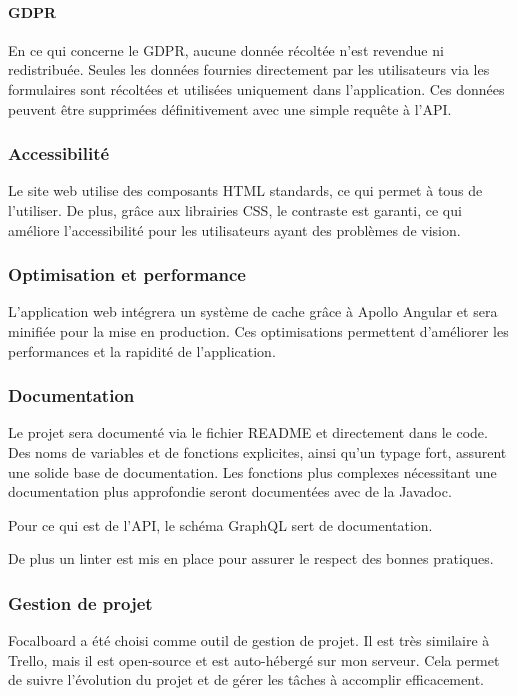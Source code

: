 \paragraph{GDPR}
En ce qui concerne le GDPR, aucune donnée récoltée n'est revendue ni redistribuée.
Seules les données fournies directement par les utilisateurs via les formulaires sont récoltées et utilisées uniquement dans l'application.
Ces données peuvent être supprimées définitivement avec une simple requête à l'API.

\subsubsection{Accessibilité}

Le site web utilise des composants HTML standards, ce qui permet à tous de l'utiliser.
De plus, grâce aux librairies CSS, le contraste est garanti, ce qui améliore l'accessibilité pour les utilisateurs ayant des problèmes de vision.

\subsubsection{Optimisation et performance}

L'application web intégrera un système de cache grâce à Apollo Angular et sera minifiée pour la mise en production.
Ces optimisations permettent d'améliorer les performances et la rapidité de l'application.

\subsubsection{Documentation}

Le projet sera documenté via le fichier README et directement dans le code.
Des noms de variables et de fonctions explicites, ainsi qu'un typage fort, assurent une solide base de documentation.
Les fonctions plus complexes nécessitant une documentation plus approfondie seront documentées avec de la Javadoc.

Pour ce qui est de l'API, le schéma GraphQL sert de documentation.

De plus un linter est mis en place pour assurer le respect des bonnes pratiques.

\subsubsection{Gestion de projet}

Focalboard a été choisi comme outil de gestion de projet.
Il est très similaire à Trello, mais il est open-source et est auto-hébergé sur mon serveur.
Cela permet de suivre l'évolution du projet et de gérer les tâches à accomplir efficacement.

